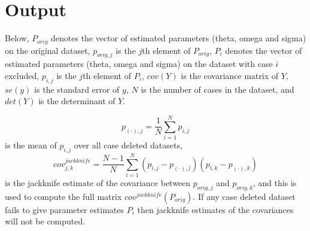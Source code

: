 \section{Output}

Below, $P_{orig}$ denotes the vector of estimated parameters (theta, omega and sigma)
on the original dataset, $p_{orig,j}$ is the $j$th element of $P_{orig}$,
$P_{i}$ denotes the vector of estimated parameters (theta, omega and sigma)
on the dataset with case $i$ excluded, $p_{i,j}$ is the $j$th element of $P_{i}$,
$cov(Y)$ is the covariance matrix of $Y$,
$se(y)$ is the standard error of $y$,
$N$ is the number of cases in the dataset,
and
$det(Y)$ is the determinant of $Y$.

\[
p_{(\cdot),j}=\frac{1}{N}\sum_{i=1}^{N}p_{i,j} 
\]
is the mean of $p_{i,j}$ over all case deleted datasets, 
\[
cov^{jackknife}_{j,k} = \frac{N-1}{N}\sum_{i=1}^{N}\left(p_{i,j}-p_{(\cdot),j}\right)\left(p_{i,k}-p_{(\cdot),k}\right)
\]
is the jackknife estimate of the covariance between $p_{orig,j}$ and $p_{orig,k}$, and this is used
to compute the full matrix
$cov^{jackknife}(P_{orig})$. If any case deleted dataset fails to give parameter estimates $P_{i}$ then
jackknife estimates of the covariances will not be computed.

